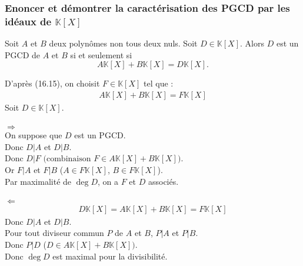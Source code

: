 \documentclass[titlepage, twoside]{report}
\begin{document}
\subsubsection{Enoncer et démontrer la caractérisation des PGCD par les idéaux de $\mathbb{K}[X]$}
\begin{tcolorbox}[title=Propostion 16.18, title filled=false, colframe=lightblue, colback=lightblue!10!white]
    Soit $A$ et $B$ deux polynômes non tous deux nuls. Soit $D \in \mathbb{K}[X]$. Alors $D$ est un PGCD de $A$ et $B$ si et seulement si 
    $$A \mathbb{K}[X] + B \mathbb{K}[X] = D \mathbb{K}[X].$$
\end{tcolorbox}

\noindent D'après (16.15), on choisit $F \in \mathbb{K}[X]$ tel que :
\begin{align*}
    A \mathbb{K}[X] + B \mathbb{K}[X] = F \mathbb{K}[X]
\end{align*}
Soit $D \in \mathbb{K}[X]$. \\ \\

$\boxed{\Rightarrow}$ \\
On suppose que $D$ est un PGCD. \\
Donc $D|A$ et $D|B$. \\
Donc $D|F \text{ (combinaison $F \in A \mathbb{K}[X] + B \mathbb{K}[X]$)}$. \\
Or $F|A$ et $F|B$ ($A \in F \mathbb{K}[X]$, $B \in F \mathbb{K}[X]$). \\
Par maximalité de $\deg D$, on a $F$ et $D$ associés. \\ \\

$\boxed{\Leftarrow}$ \\
\begin{align*}
    D \mathbb{K}[X] = A \mathbb{K}[X] + B \mathbb{K}[X] = F \mathbb{K}[X]
\end{align*}
Donc $D|A$ et $D|B$. \\
Pour tout diviseur commun $P$ de $A$ et $B$, $P|A$ et $P|B$. \\
Donc $P|D$ ($D \in A \mathbb{K}[X] + B \mathbb{K}[X])$. \\
Donc $\deg D$ est maximal pour la divisibilité. 
\end{document}
